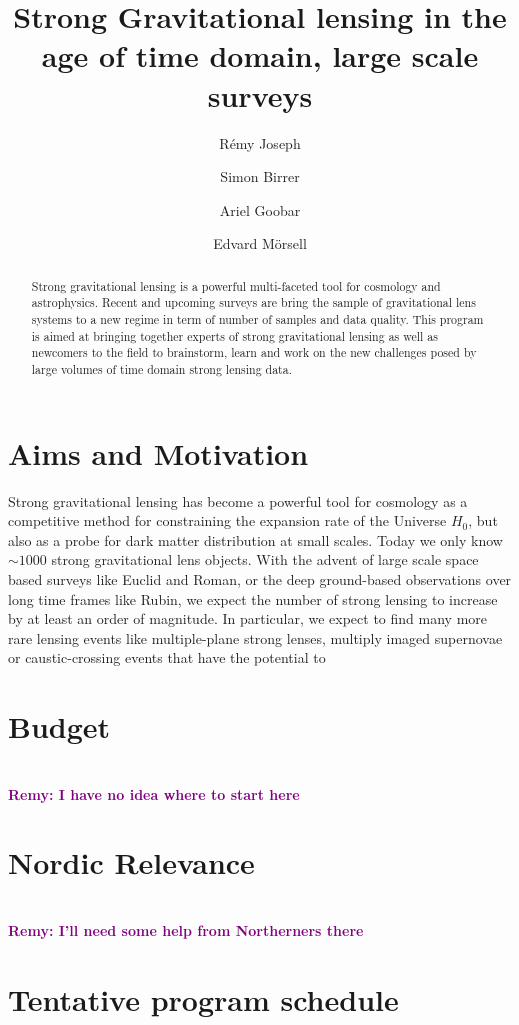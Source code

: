 \documentclass[11pt, letterpaper]{article}
\author[1]{R\'emy Joseph}
\author[2]{Simon Birrer}
\author[1]{Ariel Goobar}
\author[1]{Edvard M{\"o}rsell}
\affil[1]{The Oskar Klein Centre, Department of Physics, Stockholm University, AlbaNova, SE-10691 Stockholm, Sweden}
\affil[2]{Simon's affil}
\newcommand{\notesRemy}[1]{\textcolor{purple}{\bf \\  Remy: #1}}
\begin{document}
\title{Strong Gravitational lensing in the age of time domain, large scale surveys}
\maketitle

\begin{abstract}
    Strong gravitational lensing is a powerful multi-faceted tool for cosmology and astrophysics. Recent and upcoming surveys are bring the sample of gravitational lens systems to a new regime in term of number of samples and data quality. 
    This program is aimed at bringing together experts of strong gravitational lensing as well as newcomers to the field to brainstorm, learn and work on the new challenges posed by large volumes of time domain strong lensing data.
    
    
\end{abstract}


\section{Aims and Motivation}
    Strong gravitational lensing has become a powerful tool for cosmology as a competitive method for constraining the expansion rate of the Universe $H_0$, but also as a probe for dark matter distribution at small scales. Today we only know $\sim 1000$ strong gravitational lens objects. With the advent of large scale space based surveys like Euclid and Roman, or the deep ground-based observations over long time frames like Rubin, we expect the number of strong lensing to increase by at least an order of magnitude. In particular, we expect to find many more rare lensing events like multiple-plane strong lenses, multiply imaged supernovae or caustic-crossing events that have the potential to 
    
\section{Budget}

\notesRemy{I have no idea where to start here}

\section{Nordic Relevance}

\notesRemy{I'll need some help from Northerners there}

\section{Tentative program schedule}
\end{document}
